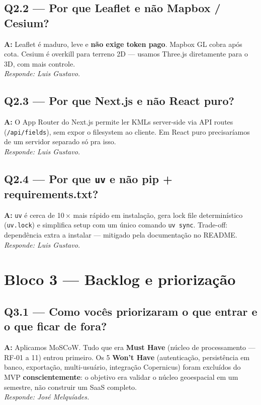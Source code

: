 \documentclass[12pt,a4paper]{article}
\begin{document}
\subsection*{Q2.2 — Por que Leaflet e não Mapbox / Cesium?}
\textbf{A:} Leaflet é maduro, leve e \textbf{não exige token pago}. Mapbox
GL cobra após cota. Cesium é overkill para terreno 2D — usamos Three.js
diretamente para o 3D, com mais controle.
\\[2pt] \textit{Responde: Luis Gustavo.}

\subsection*{Q2.3 — Por que Next.js e não React puro?}
\textbf{A:} O App Router do Next.js permite ler KMLs server-side via API
routes (\texttt{/api/fields}), sem expor o filesystem ao cliente. Em React
puro precisaríamos de um servidor separado só pra isso.
\\[2pt] \textit{Responde: Luis Gustavo.}

\subsection*{Q2.4 — Por que \texttt{uv} e não pip + requirements.txt?}
\textbf{A:} \texttt{uv} é cerca de 10\,× mais rápido em instalação, gera lock
file determinístico (\texttt{uv.lock}) e simplifica setup com um único comando
\texttt{uv sync}. Trade-off: dependência extra a instalar — mitigado pela
documentação no README.
\\[2pt] \textit{Responde: Luis Gustavo.}

\section*{Bloco 3 — Backlog e priorização}

\subsection*{Q3.1 — Como vocês priorizaram o que entrar e o que ficar de fora?}
\textbf{A:} Aplicamos MoSCoW. Tudo que era \textbf{Must Have} (núcleo de
processamento — RF-01 a 11) entrou primeiro. Os 5 \textbf{Won't Have}
(autenticação, persistência em banco, exportação, multi-usuário, integração
Copernicus) foram excluídos do MVP \textbf{conscientemente}: o objetivo era
validar o núcleo geoespacial em um semestre, não construir um SaaS completo.
\\[2pt] \textit{Responde: José Melquíades.}
\end{document}
